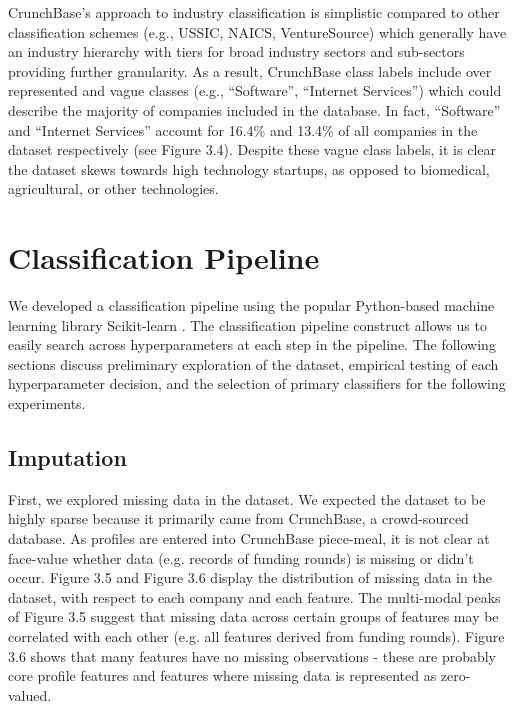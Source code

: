 \documentclass[../thesis/thesis.tex]{subfiles}
\begin{document}
\begin{enumerate}
CrunchBase’s approach to industry classification is simplistic compared to other classification schemes (e.g., USSIC, NAICS, VentureSource) which generally have an industry hierarchy with tiers for broad industry sectors and sub-sectors providing further granularity. As a result, CrunchBase class labels include over represented and vague classes (e.g., “Software”, “Internet Services”) which could describe the majority of companies included in the database. In fact, “Software” and “Internet Services” account for 16.4\% and 13.4\% of all companies in the dataset respectively (see Figure 3.4). Despite these vague class labels, it is clear the dataset skews towards high technology startups, as opposed to biomedical, agricultural, or other technologies.

\section{Classification Pipeline}

We developed a classification pipeline using the popular Python-based machine learning library Scikit-learn \cite{pedregosa2011}. The classification pipeline construct allows us to easily search across hyperparameters at each step in the pipeline. The following sections discuss preliminary exploration of the dataset, empirical testing of each hyperparameter decision, and the selection of primary classifiers for the following experiments.

\subsection{Imputation}

First, we explored missing data in the dataset. We expected the dataset to be highly sparse because it primarily came from CrunchBase, a crowd-sourced database. As profiles are entered into CrunchBase piece-meal, it is not clear at face-value whether data (e.g. records of funding rounds) is missing or didn’t occur. Figure 3.5 and Figure 3.6 display the distribution of missing data in the dataset, with respect to each company and each feature. The multi-modal peaks of Figure 3.5 suggest that missing data across certain groups of features may be correlated with each other (e.g. all features derived from funding rounds).  Figure 3.6 shows that many features have no missing observations - these are probably core profile features and features where missing data is represented as zero-valued.


\end{enumerate}
\end{document}
